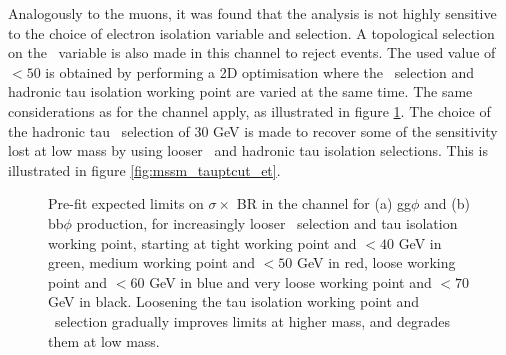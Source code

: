 Analogously to the muons, it was found that the analysis is not highly sensitive
to the choice of electron isolation variable and selection.
A topological selection on the \mT~variable is also made in this channel to reject \Wjets events. 
The used value of \mT~$< 50$ is obtained by performing a 2D optimisation where the \mT~selection
and hadronic tau isolation working point are varied at the same time. The same considerations as
for the \mutau channel apply, as illustrated in figure \ref{fig:mssm_gradcuts_et}.
The choice of the hadronic tau \pT~selection of 30 GeV is
made to recover some of the sensitivity lost at low mass by using looser \mT~and hadronic
tau isolation selections. This is illustrated in figure \ref{fig:mssm_tauptcut_et}.
\begin{figure}[h!]
\begin{center}
\end{center}
\caption{Pre-fit expected limits on $\sigma \times$ BR in the \etau channel for (a) gg$\phi$ and
(b) bb$\phi$ production, for increasingly looser \mT~selection and tau isolation working point, starting
at tight working point and \mT$<40$ GeV in green, medium working point and \mT$<50$ GeV in red,
loose working point and \mT$<60$ GeV in blue and very loose working point and \mT$<70$ GeV in black. Loosening
the tau isolation working point and \mT~selection gradually improves limits at higher mass, and
degrades them at low mass.}
\label{fig:mssm_gradcuts_et}
\end{figure}
